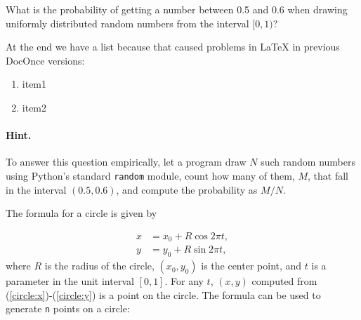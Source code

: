 \documentclass[%
oneside,                 %
final,                   %
10pt]{article}
\newenvironment{doconceexercise}{}{}
\newcounter{doconceexercisecounter}
\theoremstyle{definition}
\begin{document}
\begin{enumerate}
\begin{doconceexercise}
\label{demo:ex:2}


What is the probability of getting a number between 0.5 and 0.6 when
drawing uniformly distributed random numbers from the interval $[0,1)$?

At the end we have a list because that caused problems in {\LaTeX}
in previous DocOnce versions:

\begin{enumerate}
\item item1

\item item2
\end{enumerate}

\noindent

\paragraph{Hint.}
To answer this question empirically, let a program
draw $N$ such random numbers using Python's standard \texttt{random} module,
count how many of them, $M$, that fall in the interval $(0.5,0.6)$, and
compute the probability as $M/N$.


\end{doconceexercise}

\begin{doconceexercise}

                             
\label{proj:circle1}

The formula for a circle is given by

\begin{align}
x &= x_0 + R\cos 2\pi t,
\label{circle:x}\\ 
y &= y_0 + R\sin 2\pi t,
\label{circle:y}
\end{align}
where $R$ is the radius of the circle, $(x_0,y_0)$ is the
center point, and $t$ is a parameter in the unit interval $[0,1]$.
For any $t$, $(x,y)$ computed from (\ref{circle:x})-(\ref{circle:y})
is a point on the circle.
The formula can be used to generate \texttt{n} points on a circle:












\end{doconceexercise}
\end{enumerate}
\end{document}

